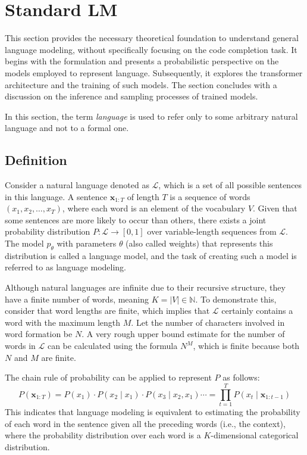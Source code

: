 \chapter{Standard LM}


This section provides the necessary theoretical foundation to understand general language modeling, without specifically focusing on the code completion task. It begins with the formulation and presents a probabilistic perspective on the models employed to represent language. Subsequently, it explores the transformer architecture and the training of such models. The section concludes with a discussion on the inference and sampling processes of trained models.

In this section, the term \textit{language} is used to refer only to some arbitrary natural language and not to a formal one.

\section{Definition}

Consider a natural language denoted as \(\mathcal{L}\), which is a set of all possible sentences in this language. A sentence \(\bm{x}_{1:T}\) of length \(T\) is a sequence of words \((x_1, x_2, \ldots, x_T)\), where each word is an element of the vocabulary \(V\). Given that some sentences are more likely to occur than others, there exists a joint probability distribution \(P : \mathcal{L} \to [0, 1]\) over variable-length sequences from \(\mathcal{L}\). The model \(p_\theta\) with parameters \(\theta\) (also called weights) that represents this distribution is called a language model, and the task of creating such a model is referred to as language modeling.

Although natural languages are infinite due to their recursive structure, they have a finite number of words, meaning \(K = |V| \in \mathbb{N}\). To demonstrate this, consider that word lengths are finite, which implies that \(\mathcal{L}\) certainly contains a word with the maximum length \(M\). Let the number of characters involved in word formation be \(N\). A very rough upper bound estimate for the number of words in \(\mathcal{L}\) can be calculated using the formula \(N^M\), which is finite because both \(N\) and \(M\) are finite.

The chain rule of probability can be applied to represent \(P\) as follows:
\begin{equation}\label{eq:probability-chain-rule}
    P(\bm{x}_{1:T}) = P(x_1) \cdot P(x_2 \mid x_1) \cdot P(x_3 \mid x_2, x_1) \cdots = \prod_{t=1}^{T}P(x_t \mid \bm{x}_{1:t-1})
\end{equation} 
This indicates that language modeling is equivalent to estimating the probability of each word in the sentence given all the preceding words (i.e., the context), where the probability distribution over each word is a \(K\)-dimensional categorical distribution.

